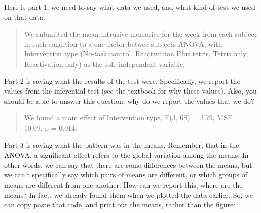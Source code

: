 \documentclass[]{book}
\newenvironment{Shaded}{\begin{snugshade}}{\end{snugshade}}
\newcommand{\KeywordTok}[1]{\textcolor[rgb]{0.13,0.29,0.53}{\textbf{{#1}}}}
\newcommand{\DataTypeTok}[1]{\textcolor[rgb]{0.13,0.29,0.53}{{#1}}}
\newcommand{\StringTok}[1]{\textcolor[rgb]{0.31,0.60,0.02}{{#1}}}
\newcommand{\CommentTok}[1]{\textcolor[rgb]{0.56,0.35,0.01}{\textit{{#1}}}}
\newcommand{\NormalTok}[1]{{#1}}
\theoremstyle{definition}
\theoremstyle{definition}
\theoremstyle{definition}
\theoremstyle{remark}
\begin{document}
Here is part 1, we need to say what data we used, and what kind of test
we used on that data:

\begin{quote}
We submitted the mean intrusive memories for the week from each subject
in each condition to a one-factor betwee-subjects ANOVA, with
Intervention type (No-task control, Reactivation Plus tetris, Tetris
only, Reactivation only) as the sole independent variable.
\end{quote}

Part 2 is saying what the results of the test were. Specifically, we
report the values from the inferential test (see the textbook for why
these values). Also, you should be able to answer this question: why do
we report the values that we do?

\begin{quote}
We found a main effect of Intervention type, F(3, 68) = 3.79, MSE =
10.09, p = 0.014.
\end{quote}

Part 3 is saying what the pattern was in the means. Remember, that in
the ANOVA, a significant effect refers to the global variation among the
means. In other words, we can say that there are some differences
between the means, but we can't specifically say which pairs of means
are different, or which groups of means are different from one another.
How can we report this, where are the means? In fact, we already found
them when we plotted the data earlier. So, we can copy paste that code,
and print out the means, rather than the figure:

\begin{Shaded}
\end{Shaded}
\end{document}
